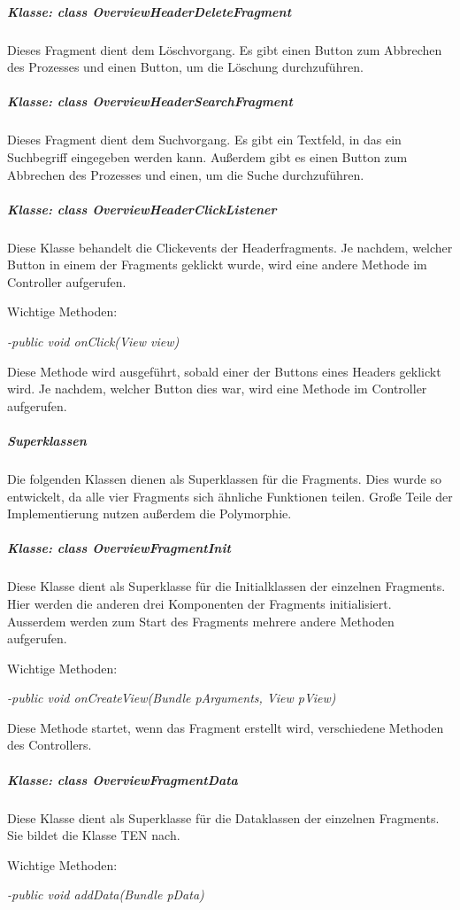 \subparagraph*{Klasse: class OverviewHeaderDeleteFragment}

Dieses Fragment dient dem Löschvorgang. Es gibt einen Button zum Abbrechen des Prozesses und einen Button, um die Löschung durchzuführen.

\subparagraph*{Klasse: class OverviewHeaderSearchFragment}

Dieses Fragment dient dem Suchvorgang. Es gibt ein Textfeld, in das ein Suchbegriff eingegeben werden kann. Außerdem gibt es einen Button zum Abbrechen des Prozesses und einen, um die Suche durchzuführen.

\subparagraph*{Klasse: class OverviewHeaderClickListener}

Diese Klasse behandelt die Clickevents der Headerfragments. Je nachdem, welcher Button in einem der Fragments geklickt wurde, wird eine andere Methode im Controller aufgerufen.

Wichtige Methoden:

\textit{-public void onClick(View view)}

Diese Methode wird ausgeführt, sobald einer der Buttons eines Headers geklickt wird. Je nachdem, welcher Button dies war, wird eine Methode im Controller aufgerufen.

\subparagraph{Superklassen}

Die folgenden Klassen dienen als Superklassen für die Fragments. Dies wurde so entwickelt, da alle vier Fragments sich ähnliche Funktionen teilen. Große Teile der Implementierung nutzen außerdem die Polymorphie.

\subparagraph*{Klasse: class OverviewFragmentInit}

Diese Klasse dient als Superklasse für die Initialklassen der einzelnen Fragments. Hier werden die anderen drei Komponenten der Fragments initialisiert. Ausserdem werden zum Start des Fragments mehrere andere Methoden aufgerufen.

Wichtige Methoden:

\textit{-public void onCreateView(Bundle pArguments, View pView)}

Diese Methode startet, wenn das Fragment erstellt wird, verschiedene Methoden des Controllers.

\subparagraph*{Klasse: class OverviewFragmentData}

Diese Klasse dient als Superklasse für die Dataklassen der einzelnen Fragments. Sie bildet die Klasse TEN nach.

Wichtige Methoden:

\textit{-public void addData(Bundle pData)}


